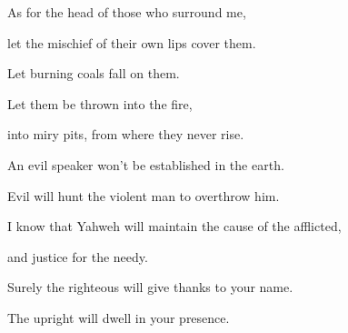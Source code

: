 {\Q {}As for the head of those who surround me,
\par }{\QB let the mischief of their own lips cover them.
\par }{\Q {}Let burning coals fall on them.
\par }{\QB Let them be thrown into the fire,
\par }{\QB into miry pits, from where they never rise.
\par }{\Q {}An evil speaker won’t be established in the earth.
\par }{\QB Evil will hunt the violent man to overthrow him.
\par }{\Q {}I know that Yahweh will maintain the cause of the afflicted,
\par }{\QB and justice for the needy.
\par }{\Q {}Surely the righteous will give thanks to your name.
\par }{\QB The upright will dwell in your presence.

}
